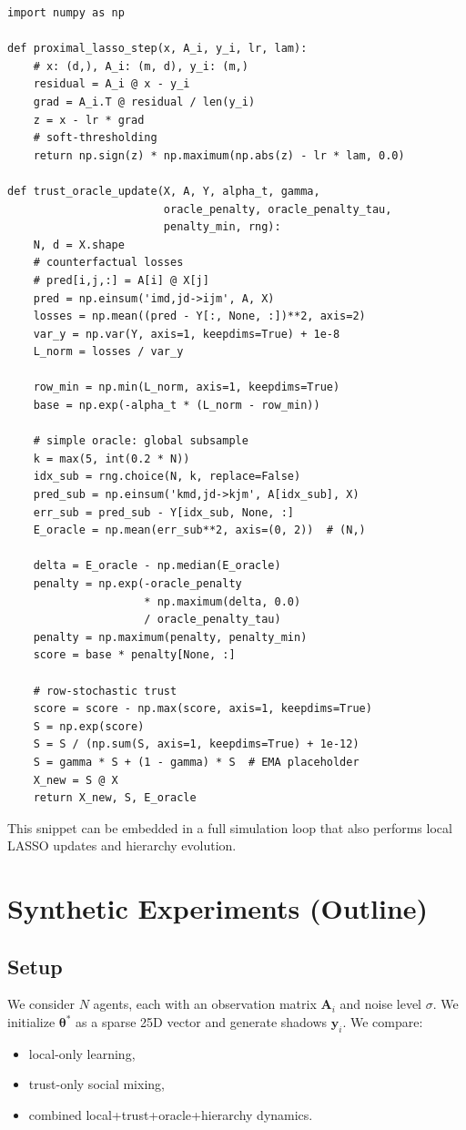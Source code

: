 \documentclass[11pt]{article}
\begin{document}
\begin{verbatim}
import numpy as np

def proximal_lasso_step(x, A_i, y_i, lr, lam):
    # x: (d,), A_i: (m, d), y_i: (m,)
    residual = A_i @ x - y_i
    grad = A_i.T @ residual / len(y_i)
    z = x - lr * grad
    # soft-thresholding
    return np.sign(z) * np.maximum(np.abs(z) - lr * lam, 0.0)

def trust_oracle_update(X, A, Y, alpha_t, gamma,
                        oracle_penalty, oracle_penalty_tau,
                        penalty_min, rng):
    N, d = X.shape
    # counterfactual losses
    # pred[i,j,:] = A[i] @ X[j]
    pred = np.einsum('imd,jd->ijm', A, X)
    losses = np.mean((pred - Y[:, None, :])**2, axis=2)
    var_y = np.var(Y, axis=1, keepdims=True) + 1e-8
    L_norm = losses / var_y

    row_min = np.min(L_norm, axis=1, keepdims=True)
    base = np.exp(-alpha_t * (L_norm - row_min))

    # simple oracle: global subsample
    k = max(5, int(0.2 * N))
    idx_sub = rng.choice(N, k, replace=False)
    pred_sub = np.einsum('kmd,jd->kjm', A[idx_sub], X)
    err_sub = pred_sub - Y[idx_sub, None, :]
    E_oracle = np.mean(err_sub**2, axis=(0, 2))  # (N,)

    delta = E_oracle - np.median(E_oracle)
    penalty = np.exp(-oracle_penalty
                     * np.maximum(delta, 0.0)
                     / oracle_penalty_tau)
    penalty = np.maximum(penalty, penalty_min)
    score = base * penalty[None, :]

    # row-stochastic trust
    score = score - np.max(score, axis=1, keepdims=True)
    S = np.exp(score)
    S = S / (np.sum(S, axis=1, keepdims=True) + 1e-12)
    S = gamma * S + (1 - gamma) * S  # EMA placeholder
    X_new = S @ X
    return X_new, S, E_oracle
\end{verbatim}

This snippet can be embedded in a full simulation loop that also
performs local LASSO updates and hierarchy evolution.

\section{Synthetic Experiments (Outline)}

\subsection{Setup}

We consider $N$ agents, each with an observation matrix $\bm{A}_i$ and
noise level $\sigma$.
We initialize $\bm{\theta}^*$ as a sparse 25D vector and generate
shadows $\bm{y}_i$.
We compare:
\begin{itemize}[noitemsep]
  \item local-only learning,
  \item trust-only social mixing,
  \item combined local+trust+oracle+hierarchy dynamics.
\end{itemize}
\end{document}
